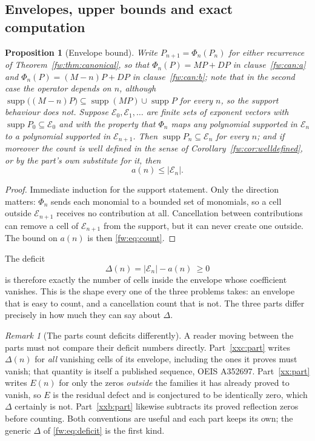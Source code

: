 \documentclass[11pt,a4paper]{article}
\numberwithin{equation}{section}
\newtheorem{proposition}[theorem]{Proposition}
\theoremstyle{definition}
\theoremstyle{remark}
\newtheorem{remark}[theorem]{Remark}
\theoremstyle{plain}
\DeclareMathOperator{\supp}{supp}
\begin{document}
\subsection{Envelopes, upper bounds and exact computation}\label{fw:envelope}

\begin{proposition}[Envelope bound]\label{fw:prop:envelope}
Write $P_{n+1}=\Phi_n(P_n)$ for either recurrence of
Theorem~\textup{\ref{fw:thm:canonical}}, so that $\Phi_n(P)=MP+DP$ in
clause~\textup{\ref{fw:can:a}} and $\Phi_n(P)=(M-n)P+DP$ in
clause~\textup{\ref{fw:can:b}}; note that in the second case the operator
depends on $n$, although $\supp\bigl((M-n)P\bigr)\subseteq\supp(MP)\cup\supp P$
for every $n$, so the support behaviour does not.  Suppose $\mathcal
E_0,\mathcal E_1,\dots$ are finite sets of exponent vectors with $\supp
P_0\subseteq\mathcal E_0$ and with the property that $\Phi_n$ maps any
polynomial supported in $\mathcal E_n$ to a polynomial supported in $\mathcal
E_{n+1}$.  Then $\supp P_n\subseteq\mathcal E_n$ for every $n$; and if moreover
the count is well defined in the sense of
Corollary~\textup{\ref{fw:cor:welldefined}}, or by the part's own substitute for
it, then
\[
 a(n)\le|\mathcal E_n| .
\]
\end{proposition}

\begin{proof}
Immediate induction for the support statement.  Only the direction matters:
$\Phi_n$ sends each monomial to a bounded set of monomials, so a cell outside
$\mathcal E_{n+1}$ receives no contribution at all.  Cancellation between
contributions can remove a cell of $\mathcal E_{n+1}$ from the support, but it
can never create one outside.  The bound on $a(n)$ is then
\eqref{fw:eq:count}.
\end{proof}

The deficit
\begin{equation}\label{fw:eq:deficit}
 \Delta(n)=|\mathcal E_n|-a(n)\ \ge 0
\end{equation}
is therefore exactly the number of cells inside the envelope whose coefficient
vanishes.  This is the shape every one of the three problems takes: an envelope
that is easy to count, and a cancellation count that is not.  The three parts
differ precisely in how much they can say about $\Delta$.

\begin{remark}[The parts count deficits differently]\label{fw:rem:deficits}
A reader moving between the parts must not compare their deficit numbers
directly.  Part~\ref{xxc:part} writes $\Delta(n)$ for \emph{all} vanishing cells
of its envelope, including the ones it proves must vanish; that quantity is
itself a published sequence, OEIS A352697.  Part~\ref{xx:part} writes $E(n)$
for only the zeros \emph{outside} the families it has already proved to vanish,
so $E$ is the residual defect and is conjectured to be identically zero, which
$\Delta$ certainly is not.  Part~\ref{xxb:part} likewise subtracts its proved
reflection zeros before counting.  Both conventions are useful and each part
keeps its own; the generic $\Delta$ of \eqref{fw:eq:deficit} is the first kind.
\end{remark}
\end{document}
